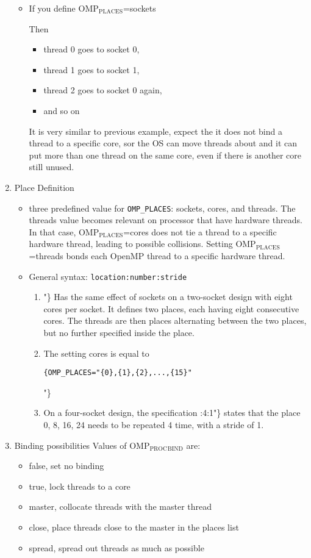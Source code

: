 \documentclass[11pt]{article}
\begin{document}
\begin{enumerate}
\begin{itemize}
\item If you define
OMP$_{\text{PLACES}}$=sockets

Then
\begin{itemize}
\item thread 0 goes to socket 0,
\item thread 1 goes to socket 1,
\item thread 2 goes to socket 0 again,
\item and so on
\end{itemize}
It is very similar to previous example, expect the it does not bind a thread to a specific core, sor the OS can move threads about and it can put more than one thread on the same core, even if there is another core still unused.
\end{itemize}

\item Place Definition
\label{sec-7-3-1-2}
\begin{itemize}
\item three predefined value for \texttt{OMP\_PLACES}: sockets, cores, and threads. The threads value becomes relevant on processor that have hardware threads. In that case, OMP$_{\text{PLACES}}$=cores does not tie a thread to a specific hardware thread, leading to possible collisions. Setting OMP$_{\text{PLACES}}$=threads bonds each OpenMP thread to a specific hardware thread.

\item General syntax: \verb~location:number:stride~
\begin{enumerate}
\item "\}
Has the same effect of sockets on a two-socket design with eight cores per socket.
It defines two places, each having eight consecutive cores. The threads are then places alternating between the two places, but no further specified inside the place.
\item The setting cores is equal to
\begin{verbatim}
{OMP_PLACES="{0},{1},{2},...,{15}"
\end{verbatim}
"\}
\item On a four-socket design, the specification
:4:1"\}
states that the place 0, 8, 16, 24 needs to be repeated 4 time, with a stride of 1.
\end{enumerate}
\end{itemize}

\item Binding possibilities
\label{sec-7-3-1-3}
Values of OMP$_{\text{PROC}}$$_{\text{BIND}}$ are:
\begin{itemize}
\item false, set no binding
\item true, lock threads to a core
\item master, collocate threads with the master thread
\item close, place threads close to the master in the places list
\item spread, spread out threads as much as possible
\end{itemize}


\end{enumerate}
\end{document}
